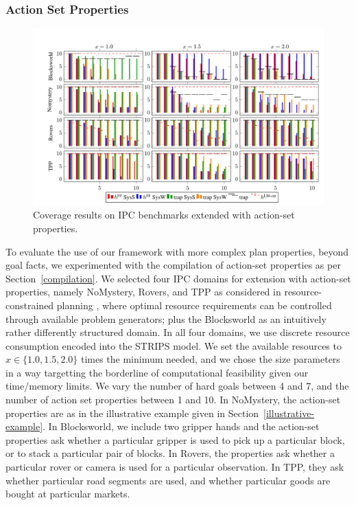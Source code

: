 \else

\subsubsection*{Action Set Properties}

\begin{figure}[htb]
\centering\centering
%
\includegraphics{data/action_set_properties/barchart/barchart.pdf}
\vspace{-0.6cm}
\caption{Coverage results on IPC benchmarks extended with action-set properties.}
\label{fig:barcharts}
\vspace{-0.2cm}
\end{figure}

To evaluate the use of our framework with more complex plan
properties, beyond goal facts, we experimented with the compilation of
action-set properties as per Section~\ref{compilation}. We selected
four IPC domains for extension with action-set properties, namely
NoMystery, Rovers, and TPP as considered in resource-constrained
planning \cite{nakhost:etal:icaps-12}, where optimal resource
requirements can be controlled through available problem generators;
plus the Blocksworld as an intuitively rather differently structured
domain. In all four domains, we use discrete resource consumption
encoded into the STRIPS model. We set the available resources to
$x \in \{1.0,1.5, 2.0\}$ times the minimum needed, and we chose the
size parameters in a way targetting the borderline of computational
feasibility given our time/memory limits. We vary the number of hard
goals between 4 and 7, and the number of action set properties between
1 and 10. In NoMystery, the action-set properties are as in the
illustrative example given in Section~\ref{illustrative-example}. In
Blocksworld, we include two gripper hands and the action-set
properties ask whether a particular gripper is used to pick up a
particular block, or to stack a particular pair of blocks. In Rovers,
the properties ask whether a particular rover or camera is used for a
particular observation. In TPP, they ask whether particular road
segments are used, and whether particular goods are bought at
particular markets.

